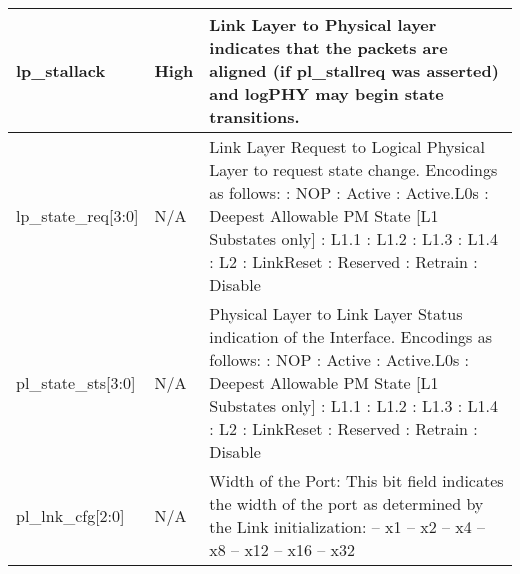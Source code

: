 \begin{table}[H]

    \centering
  \begin{tabular}{ |m{26mm}|P{18mm}|m{60mm}|  }
  \hline

\hline
lp\_stallack & High & Link Layer to Physical layer indicates that the packets are aligned (if pl\_stallreq was
asserted) and logPHY may begin state transitions. \\ \hline 
lp\_state\_req[3:0] & N/A & 
Link Layer Request to Logical Physical Layer to request state change.
Encodings as follows: : NOP : Active : Active.L0s : Deepest Allowable PM State [L1 Substates only] : L1.1 : L1.2 : L1.3 : L1.4 : L2 : LinkReset : Reserved : Retrain : Disable \newline 
\\ \hline
pl\_state\_sts[3:0] & N/A &
Physical Layer to Link Layer Status indication of the Interface.
Encodings as follows:
: NOP : Active : Active.L0s : Deepest Allowable PM State [L1 Substates only] : L1.1 : L1.2 : L1.3 : L1.4 : L2 : LinkReset : Reserved : Retrain : Disable \newline
\\ \hline
pl\_lnk\_cfg[2:0] & N/A &
Width of the Port: This bit field indicates the width of the port as determined by the Link
initialization:  – x1  – x2  – x4  – x8  – x12  – x16  – x32 \newline


\end{tabular}
\end{table}
